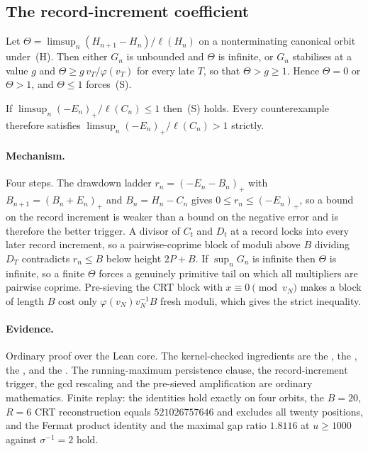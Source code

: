 \documentclass[11pt]{article}
\begin{document}
\subsection{The record-increment coefficient}

\begin{theorem}\label{long243:res:recorddichotomy}
Let $\Theta=\limsup_n(H_{n+1}-H_n)/\ell(H_n)$ on a nonterminating canonical
orbit under~(H).  Then either $G_n$ is unbounded and $\Theta$ is infinite, or
$G_n$ stabilises at a value $g$ and $\Theta\ge g\,v_T/\varphi(v_T)$ for every
late $T$, so that $\Theta>g\ge1$.  Hence $\Theta=0$ or $\Theta>1$, and
$\Theta\le1$ forces~(S).
\end{theorem}

\begin{corollary}\label{long243:res:loglogboundary}
If $\limsup_n(-E_n)_+/\ell(C_n)\le1$ then~(S) holds.  Every counterexample
therefore satisfies $\limsup_n(-E_n)_+/\ell(C_n)>1$ strictly.
\end{corollary}

\paragraph{Mechanism.}
Four steps.  The drawdown ladder $r_n=(-E_n-B_n)_+$ with $B_{n+1}=(B_n+E_n)_+$
and $B_n=H_n-C_n$ gives $0\le r_n\le(-E_n)_+$, so a bound on the record
increment is weaker than a bound on the negative error and is therefore the
better trigger.  A divisor of $C_t$ and $D_t$ at a record locks into every later
record increment, so a pairwise-coprime block of moduli above $B$ dividing $D_T$
contradicts $r_n\le B$ below height $2P+B$.  If $\sup_nG_n$ is infinite then
$\Theta$ is infinite, so a finite $\Theta$ forces a genuinely primitive tail on
which all
multipliers are pairwise coprime.  Pre-sieving the CRT block with $x\equiv0
\pmod{v_N}$ makes a block of length $B$ cost only $\varphi(v_N)v_N^{-1}B$ fresh
moduli, which gives the strict inequality.

\paragraph{Evidence.}
Ordinary proof over the Lean core.  The kernel-checked ingredients are the
, the
, the
, and the
.  The running-maximum persistence clause, the record-increment
trigger, the gcd rescaling and the pre-sieved amplification are ordinary
mathematics.  Finite replay: the identities hold exactly on four orbits, the
$B=20$, $R=6$ CRT reconstruction equals $521026757646$ and excludes all twenty
positions, and the Fermat product identity and the maximal gap ratio $1.8116$ at
$u\ge1000$ against $\sigma^{-1}=2$ hold.
\end{document}
